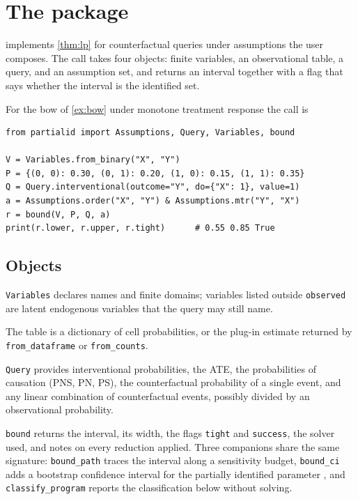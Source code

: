\section{The \pid{} package}
\label{sec:package}
\label{sec:routing}

\pid{} implements \cref{thm:lp} for counterfactual queries under assumptions the user composes. The call takes four objects: finite variables, an observational table, a query, and an assumption set, and returns an interval together with a flag that says whether the interval is the identified set.

For the bow of \cref{ex:bow} under monotone treatment response the call is
\begin{lstlisting}
from partialid import Assumptions, Query, Variables, bound

V = Variables.from_binary("X", "Y")
P = {(0, 0): 0.30, (0, 1): 0.20, (1, 0): 0.15, (1, 1): 0.35}
Q = Query.interventional(outcome="Y", do={"X": 1}, value=1)
a = Assumptions.order("X", "Y") & Assumptions.mtr("Y", "X")
r = bound(V, P, Q, a)
print(r.lower, r.upper, r.tight)      # 0.55 0.85 True
\end{lstlisting}

\subsection{Objects}
\label{sec:design}

\texttt{Variables} declares names and finite domains; variables listed outside \texttt{observed} are latent endogenous variables that the query may still name.

The table is a dictionary of cell probabilities, or the plug-in estimate returned by \texttt{from\_dataframe} or \texttt{from\_counts}.

\texttt{Query} provides interventional probabilities, the ATE, the probabilities of causation (PNS, PN, PS), the counterfactual probability of a single event, and any linear combination of counterfactual events, possibly divided by an observational probability.

\texttt{bound} returns the interval, its width, the flags \texttt{tight} and \texttt{success}, the solver used, and notes on every reduction applied. Three companions share the same signature: \texttt{bound\_path} traces the interval along a sensitivity budget, \texttt{bound\_ci} adds a bootstrap confidence interval for the partially identified parameter \citep{imbens2004confidence}, and \texttt{classify\_program} reports the classification below without solving.

